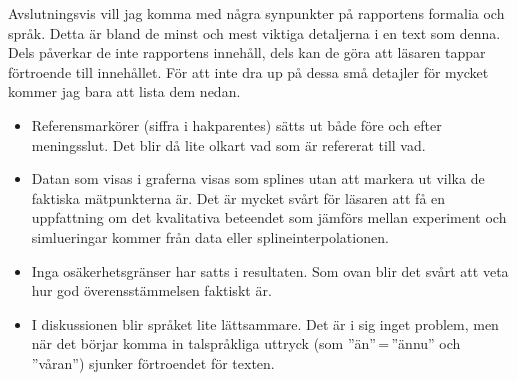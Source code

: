 \documentclass[11pt,a4paper, english, swedish
]{article}
\begin{document}
Avslutningsvis vill jag komma med några synpunkter på rapportens formalia och språk. Detta är bland de minst och mest viktiga detaljerna i en text som denna. Dels påverkar de inte rapportens innehåll, dels kan de göra att läsaren tappar förtroende till innehållet. För att inte dra up på dessa små detajler för mycket kommer jag bara att lista dem nedan.

\begin{itemize}
\item Referensmarkörer (siffra i hakparentes) sätts ut både före och efter meningsslut. Det blir då lite olkart vad som är refererat till vad.
\item Datan som visas i graferna visas som splines utan att markera ut vilka de faktiska mätpunkterna är. Det är mycket svårt för läsaren att få en uppfattning om det kvalitativa beteendet som jämförs mellan experiment och simlueringar kommer från data eller splineinterpolationen.
\item Inga osäkerhetsgränser har satts i resultaten. Som ovan blir det svårt att veta hur god överensstämmelsen faktiskt är.
\item I diskussionen blir språket lite lättsammare. Det är i sig inget problem, men när det börjar komma in talspråkliga uttryck (som ''än''\,=\,''ännu'' och ''våran'') sjunker förtroendet för texten.
\end{itemize}





\end{document}
